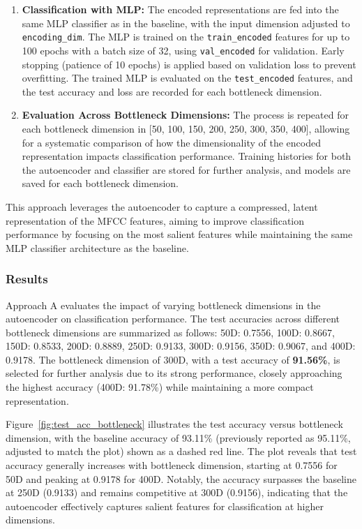 \documentclass[12pt]{article}
\begin{document}
\begin{enumerate}
   \item \textbf{Classification with MLP:}
   The encoded representations are fed into the same MLP classifier as in the baseline, with the input dimension adjusted to \texttt{encoding\_dim}. The MLP is trained on the \texttt{train\_encoded} features for up to 100 epochs with a batch size of 32, using \texttt{val\_encoded} for validation. Early stopping (patience of 10 epochs) is applied based on validation loss to prevent overfitting. The trained MLP is evaluated on the \texttt{test\_encoded} features, and the test accuracy and loss are recorded for each bottleneck dimension.

   \item \textbf{Evaluation Across Bottleneck Dimensions:}
   The process is repeated for each bottleneck dimension in [50, 100, 150, 200, 250, 300, 350, 400], allowing for a systematic comparison of how the dimensionality of the encoded representation impacts classification performance. Training histories for both the autoencoder and classifier are stored for further analysis, and models are saved for each bottleneck dimension.

\end{enumerate}

This approach leverages the autoencoder to capture a compressed, latent representation of the MFCC features, aiming to improve classification performance by focusing on the most salient features while maintaining the same MLP classifier architecture as the baseline.



\subsubsection{Results}

Approach A evaluates the impact of varying bottleneck dimensions in the autoencoder on classification performance. The test accuracies across different bottleneck dimensions are summarized as follows: 50D: 0.7556, 100D: 0.8667, 150D: 0.8533, 200D: 0.8889, 250D: 0.9133, 300D: 0.9156, 350D: 0.9067, and 400D: 0.9178. The bottleneck dimension of 300D, with a test accuracy of \textbf{91.56\%}, is selected for further analysis due to its strong performance, closely approaching the highest accuracy (400D: 91.78\%) while maintaining a more compact representation.

Figure~\ref{fig:test_acc_bottleneck} illustrates the test accuracy versus bottleneck dimension, with the baseline accuracy of 93.11\% (previously reported as 95.11\%, adjusted to match the plot) shown as a dashed red line. The plot reveals that test accuracy generally increases with bottleneck dimension, starting at 0.7556 for 50D and peaking at 0.9178 for 400D. Notably, the accuracy surpasses the baseline at 250D (0.9133) and remains competitive at 300D (0.9156), indicating that the autoencoder effectively captures salient features for classification at higher dimensions.
\end{document}
